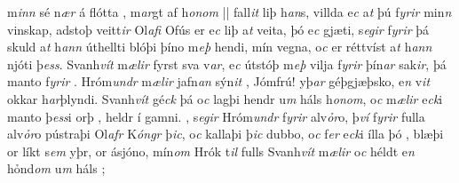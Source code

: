 m\textit{inn} sé n\textit{ær}  á flótta  ,   m\textit{ar}gt af h\textit{onom} || fall\textit{it} liþ h\textit{an}s, villda e\textit{c}  a\textit{t} þú f\textit{yrir} min\textit{n} vinskap, adstoþ   veitt\textit{ir}  Ol\textit{afi}    
Ofús  er e\textit{c}  liþ a\textit{t} veita, þó  e\textit{c} gjæti, s\textit{egir}  f\textit{yrir} þá skuld   a\textit{t} h\textit{ann}  úthellti  blóþi þíno m\textit{eþ}  hendi, mín vegna,  
o\textit{c} er   réttvíst a\textit{t} h\textit{ann}  njóti þ\textit{ess}. Svanh\textit{vít} m\textit{ælir} fyrst sva  v\textit{ar},   e\textit{c}  útstóþ   m\textit{eþ}  vilja  f\textit{yrir}
þín\textit{ar} sak\textit{ir}, 
þá  manto f\textit{yrir}   . 
Hróm\textit{undr} m\textit{ælir}  jafn\textit{an}  sýn\textit{it} , Jómfrú! yþ\textit{ar}  géþgjæþsko, 
e\textit{n}
v\textit{it}  okkar  h\textit{ar}þlyndi. 
Svanh\textit{vít} gé\textit{ck} þá   o\textit{c} lagþi hendr u\textit{m} háls h\textit{onom}, o\textit{c} m\textit{ælir} e\textit{ck}i manto
þ\textit{ess}i orþ  ,  heldr í gamni. 
, s\textit{egir} Hróm\textit{undr} f\textit{yrir} alv\textit{ỏr}o,
þ\textit{ví} f\textit{yrir} fulla  alv\textit{ỏr}o pústraþi
Ol\textit{afr} K\textit{óngr} þ\textit{ic}, o\textit{c} kallaþi þ\textit{ic} dubbo, o\textit{c} f\textit{er} e\textit{ck}i
ílla þó   , blæþi or   líkt  s\textit{em} yþr, or ásjóno,    mín\textit{om} Hrók t\textit{il} fulls Svanh\textit{vít} m\textit{ælir} o\textit{c} héldt e\textit{n} hỏnd\textit{om} u\textit{m} háls  ;  
